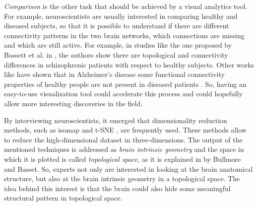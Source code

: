 \documentclass{article}
\begin{document}
\begin{multicols}{2}
\textit{Comparison} is the other task that should be achieved by a visual analytics tool. For example, neuroscientists are usually interested in comparing healthy and diseased subjects, so that it is possible to understand if there are different connectivity patterns in the two brain networks, which connections are missing and which are still active. For example, in studies like the one proposed by Bassett et al. in \cite{hierarchicalOrganization}, the authors show there are topological and connectivity differences in schizophrenic patients with respect to healthy subjects. Other works like \cite{alzheimer} have shown that in Alzheimer's disease some functional connectivity properties of healthy people are not present in diseased patients . So, having an easy-to-use visualization tool could accelerate this process and could hopefully allow more interesting discoveries in the field.

By interviewing neuroscientists, it emerged that dimensionality reduction methods, such as isomap \cite{isomap} and t-SNE \cite{tsne}, are frequently used. These methods allow to reduce the high-dimensional dataset in three-dimensions. The output of the mentioned techniques is addressed as \textit{brain intrinsic geometry} and the space in which it is plotted is called \textit{topological space}, as it is explained in \cite{bullmore2011brain} by Bullmore and Basset. So, experts not only are interested in looking at the brain anatomical structure, but also at the brain intrinsic geometry in a topological space. The idea behind this interest is that the brain could also hide some meaningful structural pattern in topological space.


\end{multicols}
\end{document}
